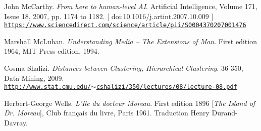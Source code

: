 \begin{thebibliography}{99}
	 John McCarthy. \textit{From here to human-level AI}. 
	 Artificial Intelligence, Volume 171, Issue 18, 2007, pp. 1174 to 1182. {\scriptsize [ doi:10.1016/j.artint.2007.10.009 ]}
	 \\ \href{https://www.sciencedirect.com/science/article/pii/S0004370207001476}{\scriptsize{\texttt{https://www.sciencedirect.com/science/article/pii/S0004370207001476}}} \normalsize{}
	 
	Marshall McLuhan. \textit{Understanding Media -- The Extensions of  Man}. First edition 1964, MIT Press edition, 1994.
				 
	 Cosma Shalizi. \textit{Distances between Clustering, Hierarchical Clustering}. 
	 36-350, Data Mining, 2009.\\ \href{http://www.stat.cmu.edu/\~cshalizi/350/lectures/08/lecture-08.pdf}{\scriptsize{\texttt{http://www.stat.cmu.edu/$\sim$cshalizi/350/lectures/08/lecture-08.pdf}}} \normalsize{}
	 
	Herbert-George Wells. \textit{L'Ile du docteur Moreau}. First edition 1896 [\textit{The Island of Dr. Moreau}], Club fran\c{c}ais du livre, Paris 1961. Traduction Henry Durand-Davray. 
		 
\end{thebibliography}